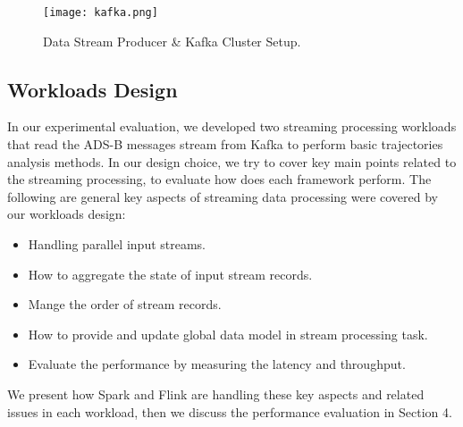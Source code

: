 \documentclass[]{article}
\begin{document}
\begin{figure}[h]
 
  \centering
    \texttt{[image: kafka.png]}
     \caption{Data Stream Producer \& Kafka Cluster Setup.}
\end{figure} 

\subsection{Workloads Design}
In our experimental evaluation, we developed two streaming processing workloads that read the ADS-B messages stream from Kafka to perform basic trajectories analysis methods. In our design choice, we try to cover key main points related to the streaming processing, to evaluate how  does each framework perform. The following are general key aspects of  streaming data processing were covered by our workloads design: 

\begin{itemize}
\item Handling parallel input streams.
\item How to aggregate the state of input stream records.
\item Mange the order of stream records.
\item How to provide and update global data model in stream processing task.
\item Evaluate the performance by measuring  the latency and throughput.
\end{itemize}
We present how Spark and Flink are handling these key aspects and related issues in each workload, then we discuss the performance evaluation in Section 4.
\end{document}
